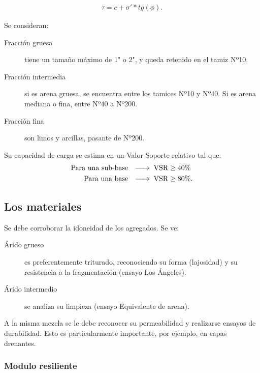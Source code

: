 \documentclass[../main.tex]{subfiles}
\begin{document}
\begin{align*}
  \tau = c + \sigma' * tg(\phi)
.\end{align*}

Se consideran:

\begin{description}
  \item[Fracción gruesa] tiene un tamaño máximo de 1" o 2", y queda retenido en
    el tamiz Nº10.
  \item[Fracción intermedia] si es arena gruesa, se encuentra entre los tamices
    Nº10 y Nº40. Si es arena mediana o fina, entre Nº40 a Nº200.
  \item[Fracción fina] son limos y arcillas, pasante de Nº200.
\end{description}

Su capacidad de carga se estima en un Valor Soporte relativo tal que:
\begin{align*}
  \text{Para una sub-base} & \hspace{0.25cm} \xrightarrow{\hspace*{0.5cm}} \hspace{0.1cm} \text{VSR} \geq 40\% \\
  \text{Para una base} & \hspace{0.25cm} \xrightarrow{\hspace*{0.5cm}} \hspace{0.1cm} \text{VSR} \geq 80\%
.\end{align*}

\subsection{Los materiales}

Se debe corroborar la idoneidad de los agregados. Se ve:

\begin{description}
  \item[Árido grueso] es preferentemente triturado, reconociendo su forma 
    (lajosidad) y su resistencia a la fragmentación (ensayo Los Ángeles).
  \item[Árido intermedio] se analiza su limpieza (ensayo Equivalente de arena).
\end{description}

A la misma mezcla se le debe reconocer su permeabilidad y realizarse ensayos de
durabilidad. Esto es particularmente importante, por ejemplo, en capas drenantes.

\subsubsection{Modulo resiliente}
\end{document}
